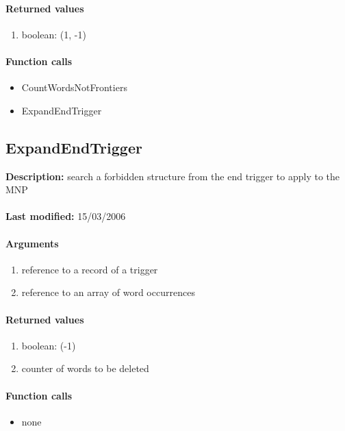 \paragraph{Returned values}
\begin{enumerate}
\item boolean: (1, -1)
\end{enumerate}

\paragraph{Function calls}
\begin{itemize}
\item CountWordsNotFrontiers
\item ExpandEndTrigger
\end{itemize}

\subsection{ExpandEndTrigger}
\textbf{Description:} search a forbidden structure from the end trigger to apply to the MNP\\
\\\textbf{Last modified:} 15/03/2006

\paragraph{Arguments}
\begin{enumerate}
\item reference to a record of a trigger
\item reference to an array of word occurrences
\end{enumerate}

\paragraph{Returned values}
\begin{enumerate}
\item boolean: (-1)
\item counter of words to be deleted
\end{enumerate}

\paragraph{Function calls}
\begin{itemize}
\item none
\end{itemize}

